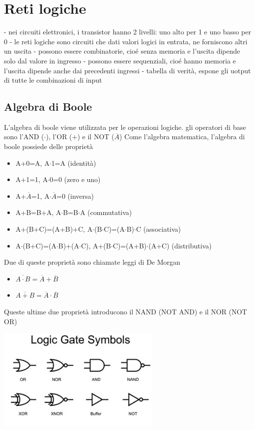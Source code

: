 \documentclass[12pt, a4paper]{article}
\begin{document}
\newpage
\section{Reti logiche}
- nei circuiti elettronici, i transistor hanno 2 livelli: uno alto per 1 e uno basso per 0
- le reti logiche sono circuiti che dati valori logici in entrata, ne forniscono altri un uscita
 - possono essere combinatorie, cioé senza memoria e l'uscita dipende solo dal valore in ingresso
 - possono essere sequenziali, cioé hanno memoria e l'uscita dipende anche dai precedenti ingressi
- tabella di verità, espone gli uotput di tutte le combinazioni di input

\subsection{Algebra di Boole}
L'algebra di boole viene utilizzata per le operazioni logiche. gli operatori di base sono l'AND ($\cdot$), l'OR (+) e il NOT ($\overline{A}$)
Come l'algebra matematica, l'algebra di boole possiede delle proprietà
\begin{itemize}
  \item A+0=A, A$\cdot$1=A (identità)
  \item A+1=1, A$\cdot$0=0 (zero e uno)
  \item A+$\overline{A}$=1, A$\cdot$$\overline{A}$=0 (inversa)
  \item A+B=B+A, A$\cdot$B=B$\cdot$A (commutativa)
  \item A+(B+C)=(A+B)+C, A$\cdot$(B$\cdot$C)=(A$\cdot$B)$\cdot$C (associativa)
  \item A$\cdot$(B+C)=(A$\cdot$B)+(A$\cdot$C), A+(B$\cdot$C)=(A+B)$\cdot$(A+C) (distributiva)
\end{itemize}

Due di queste proprietà sono chiamate leggi di De Morgan
\begin{itemize}
  \item $\overline{A\cdot B} = \overline{A} + \overline{B}$
  \item $\overline{A+B} = \overline{A}\cdot\overline{B}$
\end{itemize}
Queste ultime due proprietà introducono il NAND (NOT AND) e il NOR (NOT OR)
\begin{center}
  \includegraphics[width=300px]{images/logicGates.jpg}
\end{center}
\end{document}
